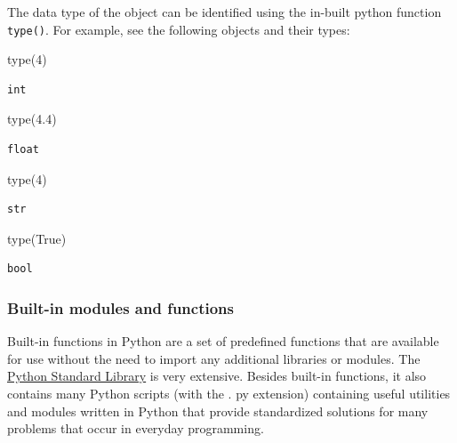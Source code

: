 \documentclass[
  letterpaper,
  DIV=11,
  numbers=noendperiod]{scrreprt}
\newenvironment{Shaded}{\begin{snugshade}}{\end{snugshade}}
\newcommand{\BuiltInTok}[1]{\textcolor[rgb]{0.00,0.23,0.31}{#1}}
\newcommand{\DecValTok}[1]{\textcolor[rgb]{0.68,0.00,0.00}{#1}}
\newcommand{\FloatTok}[1]{\textcolor[rgb]{0.68,0.00,0.00}{#1}}
\newcommand{\NormalTok}[1]{\textcolor[rgb]{0.00,0.23,0.31}{#1}}
\newcommand{\StringTok}[1]{\textcolor[rgb]{0.13,0.47,0.30}{#1}}
\newcommand{\VariableTok}[1]{\textcolor[rgb]{0.07,0.07,0.07}{#1}}
\begin{document}
The data type of the object can be identified using the in-built python
function \texttt{type()}. For example, see the following objects and
their types:

\begin{Shaded}
\begin{Highlighting}[]
\BuiltInTok{type}\NormalTok{(}\DecValTok{4}\NormalTok{)}
\end{Highlighting}
\end{Shaded}

\begin{verbatim}
int
\end{verbatim}

\begin{Shaded}
\begin{Highlighting}[]
\BuiltInTok{type}\NormalTok{(}\FloatTok{4.4}\NormalTok{)}
\end{Highlighting}
\end{Shaded}

\begin{verbatim}
float
\end{verbatim}

\begin{Shaded}
\begin{Highlighting}[]
\BuiltInTok{type}\NormalTok{(}\StringTok{\textquotesingle{}4\textquotesingle{}}\NormalTok{)}
\end{Highlighting}
\end{Shaded}

\begin{verbatim}
str
\end{verbatim}

\begin{Shaded}
\begin{Highlighting}[]
\BuiltInTok{type}\NormalTok{(}\VariableTok{True}\NormalTok{)}
\end{Highlighting}
\end{Shaded}

\begin{verbatim}
bool
\end{verbatim}

\hypertarget{built-in-modules-and-functions}{%
\subsubsection{Built-in modules and
functions}\label{built-in-modules-and-functions}}

Built-in functions in Python are a set of predefined functions that are
available for use without the need to import any additional libraries or
modules. The \href{https://docs.python.org/3/library/}{Python Standard
Library} is very extensive. Besides built-in functions, it also contains
many Python scripts (with the . py extension) containing useful
utilities and modules written in Python that provide standardized
solutions for many problems that occur in everyday programming.
\end{document}
